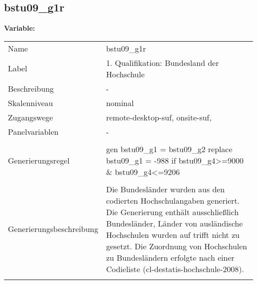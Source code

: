 	
	
	\subsection{bstu09\_g1r}
	\label{subSection:bstu09_g1r}

	\noindent\textbf{Variable:}\\
		\begin{tabular}{lL{11.3cm}}
			\label{tableVariable:bstu09_g1r}
			Name & bstu09\_g1r \\
			Label & 1. Qualifikation: Bundesland der Hochschule \\
			Beschreibung & - \\
			Skalenniveau & nominal \\
			Zugangswege &
				remote-desktop-suf,
				onsite-suf,
 \\
			Panelvariablen & -
			 \\
			 \\
					Generierungsregel & gen bstu09\_g1  = bstu09\_g2
replace bstu09\_g1  = -988 if bstu09\_g4\textgreater{}=9000 \& bstu09\_g4\textless{}=9206 \\
				 \\
					Generierungsbeschreibung & Die Bundesländer wurden aus den codierten Hochschulangaben generiert. Die Generierung enthält ausschließlich Bundesländer, Länder von ausländische Hochschulen wurden auf trifft nicht zu gesetzt. Die Zuordnung von Hochschulen zu Bundesländern erfolgte nach einer Codieliste (cl-destatis-hochschule-2008).
				 \\	
			 \\
		\end{tabular}






